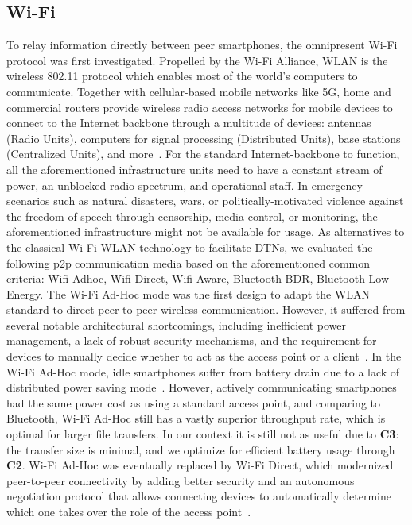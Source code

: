 \subsection{Wi-Fi}
To relay information directly between peer smartphones, the omnipresent Wi-Fi protocol was first investigated. Propelled by the Wi-Fi Alliance, WLAN is the wireless 802.11 protocol which enables most of the world's computers to communicate. Together with cellular-based mobile networks like 5G, home and commercial routers provide wireless radio access networks for mobile devices to connect to the Internet backbone through a multitude of devices: antennas (Radio Units), computers for signal processing (Distributed Units), base stations (Centralized Units), and more~\cite{5g}.
For the standard Internet-backbone to function, all the aforementioned infrastructure units need to have a constant stream of power, an unblocked radio spectrum, and operational staff. In emergency scenarios such as natural disasters, wars, or politically-motivated violence against the freedom of speech through censorship, media control, or monitoring, the aforementioned infrastructure might not be available for usage.
As alternatives to the classical Wi-Fi WLAN technology to facilitate DTNs, we evaluated the following p2p communication media based on the aforementioned common criteria: Wifi Adhoc, Wifi Direct, Wifi Aware, Bluetooth BDR, Bluetooth Low Energy.
The Wi-Fi Ad-Hoc mode was the first design to adapt the WLAN standard to direct peer-to-peer wireless communication.
However, it suffered from several notable architectural shortcomings, including inefficient power management, a lack of robust security mechanisms, and the requirement for devices to manually decide whether to act as the access point or a client~\cite{2012IEEE80211}.
In the Wi-Fi Ad-Hoc mode, idle smartphones suffer from battery drain due to a lack of distributed power saving mode~\cite{Friedman2013}. However, actively communicating smartphones had the same power cost as using a standard access point, and comparing to Bluetooth, Wi-Fi Ad-Hoc still has a vastly superior throughput rate, which is optimal for larger file transfers.
In our context it is still not as useful due to \textbf{C3}: the transfer size is minimal, and we optimize for efficient battery usage through \textbf{C2}.
Wi-Fi Ad-Hoc was eventually replaced by Wi-Fi Direct, which modernized peer-to-peer connectivity by adding better security and an autonomous negotiation protocol that allows connecting devices to automatically determine which one takes over the role of the access point~\cite{CampsMur2013,Strobel2024}.
